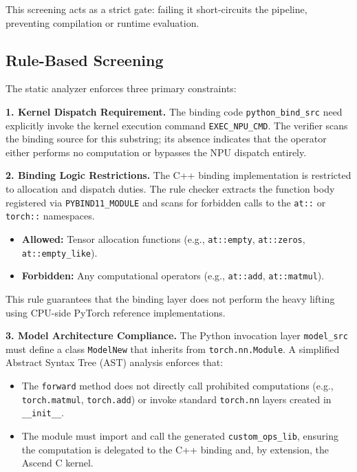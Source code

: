 \documentclass{article} %
\theoremstyle{definition}
\theoremstyle{remark}
\begin{document}
  This screening acts as a strict gate: failing it short-circuits the pipeline, preventing compilation or runtime evaluation.

  \subsection{Rule-Based Screening}
  The static analyzer enforces three primary constraints:

  \textbf{1. Kernel Dispatch Requirement.}
  The binding code \texttt{python\_bind\_src} need explicitly invoke the kernel execution command \texttt{EXEC\_NPU\_CMD}. The verifier scans the binding source for this substring; its absence indicates that the operator either performs no computation or bypasses the NPU dispatch entirely.

  \textbf{2. Binding Logic Restrictions.}
  The C++ binding implementation is restricted to allocation and dispatch duties. The rule checker extracts the function body registered via \texttt{PYBIND11\_MODULE} and scans for forbidden calls to the \texttt{at::} or \texttt{torch::} namespaces.
  \begin{itemize}
      \item \textbf{Allowed:} Tensor allocation functions (e.g., \texttt{at::empty}, \texttt{at::zeros}, \texttt{at::empty\_like}).
      \item \textbf{Forbidden:} Any computational operators (e.g., \texttt{at::add}, \texttt{at::matmul}).
  \end{itemize}
  This rule guarantees that the binding layer does not perform the heavy lifting using CPU-side PyTorch reference implementations.

  \textbf{3. Model Architecture Compliance.}
  The Python invocation layer \texttt{model\_src} must define a class \texttt{ModelNew} that inherits from \texttt{torch.nn.Module}. A simplified Abstract Syntax Tree (AST) analysis enforces that:
  \begin{itemize}
      \item The \texttt{forward} method does not directly call prohibited computations (e.g., \texttt{torch.matmul}, \texttt{torch.add}) or invoke standard \texttt{torch.nn} layers created in \texttt{\_\_init\_\_}.
      \item The module must import and call the generated \texttt{custom\_ops\_lib}, ensuring the computation is delegated to the C++ binding and, by extension, the Ascend C kernel.
  \end{itemize}
\end{document}
